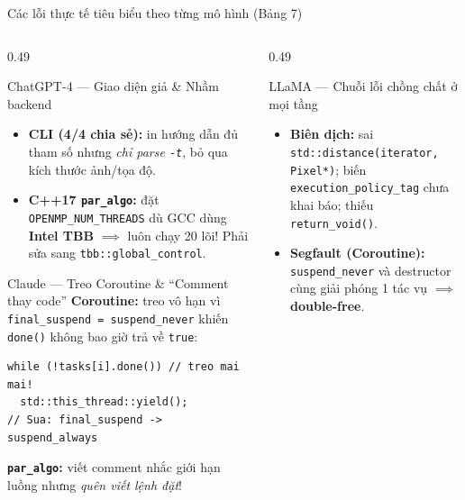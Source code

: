 \documentclass[aspectratio=169,10pt]{beamer}
\newcommand{\code}[1]{\texttt{\color{BlueDark}#1}}
\newcommand{\bad}[1]{\textcolor{BadRed}{\bfseries #1}}
\begin{document}
\begin{frame}[fragile]{Các lỗi thực tế tiêu biểu theo từng mô hình (Bảng 7)}
\begin{columns}[T,totalwidth=\textwidth]
  \begin{column}{0.49\textwidth}
    \begin{bluebox}[height=2.55cm,top=3pt,bottom=3pt]{ChatGPT-4 --- Giao diện giả \& Nhầm backend}
      \begin{itemize}\scriptsize\setlength{\itemsep}{1.5pt}
        \item \textbf{CLI (4/4 chia sẻ):} in hướng dẫn đủ tham số nhưng \emph{chỉ parse \code{-t}}, bỏ qua kích thước ảnh/tọa độ.
        \item \textbf{C++17 \code{par\_algo}:} đặt \code{OPENMP\_NUM\_THREADS} dù GCC dùng \textbf{Intel TBB} $\implies$ luôn chạy 20 lõi! Phải sửa sang \code{tbb::global\_control}.
      \end{itemize}
    \end{bluebox}
    \vspace{0.18cm}
    \begin{bluebox}[height=3.20cm,top=3pt,bottom=3pt]{Claude --- Treo Coroutine \& ``Comment thay code''}
      \scriptsize \textbullet\;\textbf{Coroutine:} treo vô hạn vì \code{final\_suspend = suspend\_never} khiến \code{done()} không bao giờ trả về \code{true}:
\begin{lstlisting}[basicstyle=\ttfamily\scriptsize]
while (!tasks[i].done()) // treo mai mai!
  std::this_thread::yield();
// Sua: final_suspend -> suspend_always
\end{lstlisting}
      \scriptsize\textbullet\;\textbf{\code{par\_algo}:} viết comment nhắc giới hạn luồng nhưng \emph{quên viết lệnh đặt}!
    \end{bluebox}
  \end{column}
  \begin{column}{0.49\textwidth}
    \begin{bluebox}[height=3.95cm,top=3pt,bottom=3pt]{LLaMA --- Chuỗi lỗi chồng chất ở mọi tầng}
      \begin{itemize}\scriptsize\setlength{\itemsep}{2pt}
        \item \textbf{Biên dịch:} sai \code{std::distance(iterator, Pixel*)}; biến \code{execution\_policy\_tag} chưa khai báo; thiếu \code{return\_void()}.
        \item \textbf{Segfault (Coroutine):} \code{suspend\_never} và destructor cùng giải phóng 1 tác vụ $\implies$ \bad{double-free}.

\end{itemize}
\end{bluebox}
\end{column}
\end{columns}
\end{frame}
\end{document}
